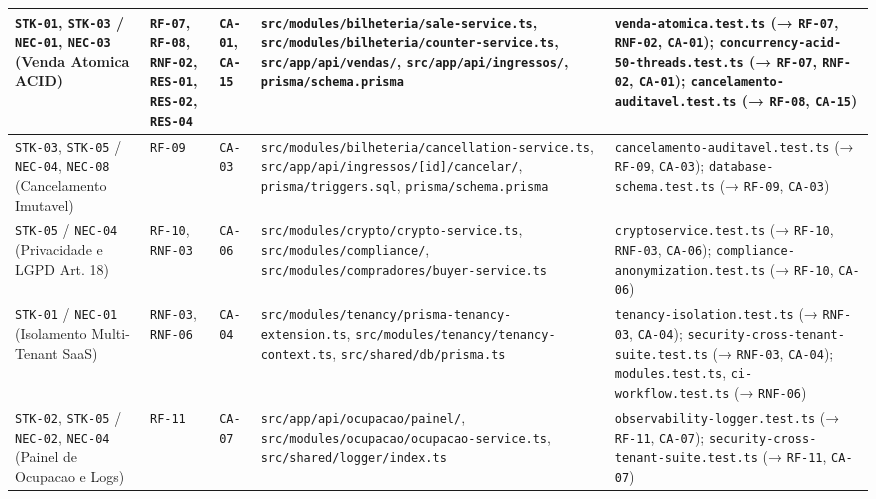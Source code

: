 \begin{center}
\begin{tabularx}{\textwidth}{>{\raggedright\arraybackslash}m{2.6cm} >{\raggedright\arraybackslash}m{1.7cm} >{\raggedright\arraybackslash}m{1.3cm} >{\raggedright\arraybackslash}m{4.0cm} Y}
\midrule
\texttt{STK-01}, \texttt{STK-03} / \texttt{NEC-01}, \texttt{NEC-03} (Venda Atomica ACID) & \texttt{RF-07}, \texttt{RF-08}, \texttt{RNF-02}, \texttt{RES-01}, \texttt{RES-02}, \texttt{RES-04} & \texttt{CA-01}, \texttt{CA-15} & \texttt{src/modules/bilheteria/sale-service.ts}, \texttt{src/modules/bilheteria/counter-service.ts}, \texttt{src/app/api/vendas/}, \texttt{src/app/api/ingressos/}, \texttt{prisma/schema.prisma} & \texttt{venda-atomica.test.ts} (→ \texttt{RF-07}, \texttt{RNF-02}, \texttt{CA-01}); \texttt{concurrency-acid-50-threads.test.ts} (→ \texttt{RF-07}, \texttt{RNF-02}, \texttt{CA-01}); \texttt{cancelamento-auditavel.test.ts} (→ \texttt{RF-08}, \texttt{CA-15}) \\
\midrule
\texttt{STK-03}, \texttt{STK-05} / \texttt{NEC-04}, \texttt{NEC-08} (Cancelamento Imutavel) & \texttt{RF-09} & \texttt{CA-03} & \texttt{src/modules/bilheteria/cancellation-service.ts}, \texttt{src/app/api/ingressos/[id]/cancelar/}, \texttt{prisma/triggers.sql}, \texttt{prisma/schema.prisma} & \texttt{cancelamento-auditavel.test.ts} (→ \texttt{RF-09}, \texttt{CA-03}); \texttt{database-schema.test.ts} (→ \texttt{RF-09}, \texttt{CA-03}) \\
\midrule
\texttt{STK-05} / \texttt{NEC-04} (Privacidade e LGPD Art. 18) & \texttt{RF-10}, \texttt{RNF-03} & \texttt{CA-06} & \texttt{src/modules/crypto/crypto-service.ts}, \texttt{src/modules/compliance/}, \texttt{src/modules/compradores/buyer-service.ts} & \texttt{cryptoservice.test.ts} (→ \texttt{RF-10}, \texttt{RNF-03}, \texttt{CA-06}); \texttt{compliance-anonymization.test.ts} (→ \texttt{RF-10}, \texttt{CA-06}) \\
\midrule
\texttt{STK-01} / \texttt{NEC-01} (Isolamento Multi-Tenant SaaS) & \texttt{RNF-03}, \texttt{RNF-06} & \texttt{CA-04} & \texttt{src/modules/tenancy/prisma-tenancy-extension.ts}, \texttt{src/modules/tenancy/tenancy-context.ts}, \texttt{src/shared/db/prisma.ts} & \texttt{tenancy-isolation.test.ts} (→ \texttt{RNF-03}, \texttt{CA-04}); \texttt{security-cross-tenant-suite.test.ts} (→ \texttt{RNF-03}, \texttt{CA-04}); \texttt{modules.test.ts}, \texttt{ci-workflow.test.ts} (→ \texttt{RNF-06}) \\
\midrule
\texttt{STK-02}, \texttt{STK-05} / \texttt{NEC-02}, \texttt{NEC-04} (Painel de Ocupacao e Logs) & \texttt{RF-11} & \texttt{CA-07} & \texttt{src/app/api/ocupacao/painel/}, \texttt{src/modules/ocupacao/ocupacao-service.ts}, \texttt{src/shared/logger/index.ts} & \texttt{observability-logger.test.ts} (→ \texttt{RF-11}, \texttt{CA-07}); \texttt{security-cross-tenant-suite.test.ts} (→ \texttt{RF-11}, \texttt{CA-07}) \\

\end{tabularx}
\end{center}
